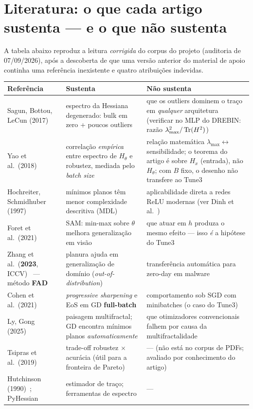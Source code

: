 \section{Literatura: o que cada artigo sustenta --- e o que não sustenta}\label{sec:literatura}

A tabela abaixo reproduz a leitura \emph{corrigida} do corpus do projeto (auditoria de 07/09/2026), após a descoberta de que uma versão anterior do material de apoio continha uma referência inexistente e quatro atribuições indevidas.

\begin{center}\small
\begin{tabular}{@{}p{3.1cm}p{5.4cm}p{6.3cm}@{}}
\toprule
Referência & Sustenta & Não sustenta \\ \midrule
Sagun, Bottou, LeCun (2017)~\cite{sagun2017} & espectro da Hessiana degenerado: bulk em zero + poucos outliers & que os outliers dominem o traço em \emph{qualquer} arquitetura (verificar no MLP do DREBIN: razão $\lambda_{\max}^2/\operatorname{Tr}(H^2)$) \\
Yao et al.\ (2018)~\cite{yao2018} & correlação \emph{empírica} entre espectro de $H_\theta$ e robustez, mediada pelo \emph{batch size} & relação matemática $\lambda_{\max}\leftrightarrow$ sensibilidade; o teorema do artigo é sobre $H_x$ (entrada), não $H_\theta$; com $B$ fixo, o desenho não transfere ao Tune3 \\
Hochreiter, Schmidhuber (1997)~\cite{hochreiter1997} & mínimos planos têm menor complexidade descritiva (MDL) & aplicabilidade direta a redes ReLU modernas (ver Dinh et al.~\cite{dinh2017}) \\
Foret et al.\ (2021)~\cite{foret2021} & SAM: min-max sobre $\theta$ melhora generalização em visão & que atuar em $h$ produza o mesmo efeito --- isso \emph{é} a hipótese do Tune3 \\
Zhang et al.\ (\textbf{2023}, ICCV)~\cite{zhang2023} --- método \textbf{FAD} & planura ajuda em generalização de domínio (\emph{out-of-distribution}) & transferência automática para zero-day em malware \\
Cohen et al.\ (2021)~\cite{cohen2021} & \emph{progressive sharpening} e EoS em GD \textbf{full-batch} & comportamento sob SGD com minibatches (o caso do Tune3) \\
Ly, Gong (2025)~\cite{ly2025} & paisagem multifractal; GD encontra mínimos planos \emph{automaticamente} & que otimizadores convencionais falhem por causa da multifractalidade \\
Tsipras et al.\ (2019)~\cite{tsipras2019} & trade-off robustez $\times$ acurácia (útil para a fronteira de Pareto) & --- (não está no corpus de PDFs; avaliado por conhecimento do artigo) \\
Hutchinson (1990)~\cite{hutchinson1990}; PyHessian~\cite{yao2020} & estimador de traço; ferramentas de espectro & --- \\
\bottomrule
\end{tabular}
\end{center}

